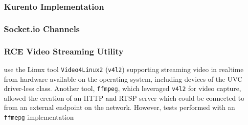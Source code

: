     \subsubsection{Kurento Implementation}
    
    \subsubsection{Socket.io Channels}
    
    \subsubsection{RCE Video Streaming Utility}
      use the Linux tool \texttt{Video4Linux2} (\texttt{v4l2}) supporting streaming video in realtime from hardware available on the operating system, including devices of the UVC driver-less class. Another tool, \texttt{ffmpeg}, which leveraged \texttt{v4l2} for video capture, allowed the creation of an HTTP and RTSP server which could be connected to from an external endpoint on the network. However, tests performed with an \texttt{ffmepg} implementation
      